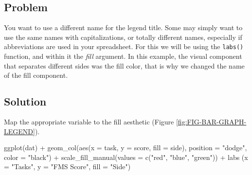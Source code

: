 \documentclass[
]{book}
\newenvironment{Shaded}{\begin{snugshade}}{\end{snugshade}}
\newcommand{\AttributeTok}[1]{\textcolor[rgb]{0.77,0.63,0.00}{#1}}
\newcommand{\FunctionTok}[1]{\textcolor[rgb]{0.00,0.00,0.00}{#1}}
\newcommand{\NormalTok}[1]{#1}
\newcommand{\SpecialCharTok}[1]{\textcolor[rgb]{0.00,0.00,0.00}{#1}}
\newcommand{\StringTok}[1]{\textcolor[rgb]{0.31,0.60,0.02}{#1}}
\begin{document}
\hypertarget{problem-19}{%
\subsection{Problem}\label{problem-19}}

You want to use a different name for the legend title. Some may simply want to use the same names with capitalizations, or totally different names, especially if abbreviations are used in your spreadsheet. For this we will be using the \texttt{labs()} function, and within it the \emph{fill} argument. In this example, the visual component that separates different sides was the fill color, that is why we changed the name of the fill component.

\hypertarget{solution-19}{%
\subsection{Solution}\label{solution-19}}

Map the appropriate variable to the fill aesthetic (Figure \ref{fig:FIG-BAR-GRAPH-LEGEND}).

\begin{Shaded}
\begin{Highlighting}[]
\FunctionTok{ggplot}\NormalTok{(dat) }\SpecialCharTok{+}
  \FunctionTok{geom\_col}\NormalTok{(}\FunctionTok{aes}\NormalTok{(}\AttributeTok{x =}\NormalTok{ task, }\AttributeTok{y =}\NormalTok{ score, }\AttributeTok{fill =}\NormalTok{ side), }\AttributeTok{position =} \StringTok{"dodge"}\NormalTok{, }\AttributeTok{color =} \StringTok{"black"}\NormalTok{) }\SpecialCharTok{+}
  \FunctionTok{scale\_fill\_manual}\NormalTok{(}\AttributeTok{values =} \FunctionTok{c}\NormalTok{(}\StringTok{"red"}\NormalTok{, }\StringTok{"blue"}\NormalTok{, }\StringTok{"green"}\NormalTok{)) }\SpecialCharTok{+}
  \FunctionTok{labs}\NormalTok{ (}\AttributeTok{x =} \StringTok{"Tasks"}\NormalTok{,}
        \AttributeTok{y =} \StringTok{"FMS Score"}\NormalTok{,}
        \AttributeTok{fill =} \StringTok{"Side"}\NormalTok{)}
\end{Highlighting}
\end{Shaded}
\end{document}
